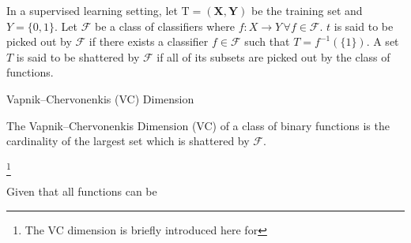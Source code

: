 In a supervised learning setting, let  $\mathrm{T} = (\textbf{X},\textbf{Y})$ be the training set and $Y = \{0,1 \}$. Let $\mathcal {F}$ be a class of classifiers where $f: X \rightarrow Y \, \forall f \in \mathcal {F}$. $t$ is said to be picked out by $\mathcal {F}$ if there exists a classifier $f \in \mathcal {F}$ such that $T = f^{-1}(\{1\})$. 
A set $T$ is said to be shattered by $\mathcal {F}$ if all of its subsets are picked out by the class of functions.

\begin{definition}{Vapnik–Chervonenkis (VC) Dimension}
 	
 	The Vapnik–Chervonenkis Dimension (VC) of a class of binary functions is the cardinality of the largest set which is shattered by $\mathcal {F}$.
\end{definition}\footnote{The VC dimension is briefly introduced here for }
 
Given that all functions can be 
 
